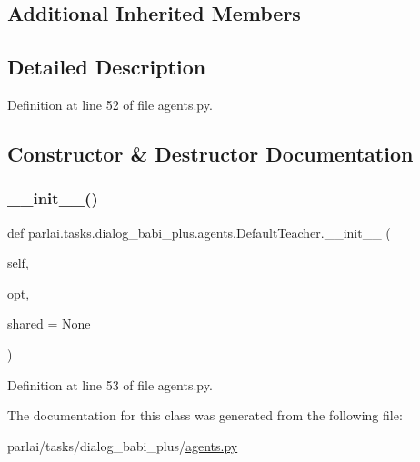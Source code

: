 \subsection*{Additional Inherited Members}


\subsection{Detailed Description}


Definition at line 52 of file agents.\+py.



\subsection{Constructor \& Destructor Documentation}
\mbox{\label{classparlai_1_1tasks_1_1dialog__babi__plus_1_1agents_1_1DefaultTeacher_a672986e909678e098b1315a614611c32}} 
\subsubsection{\texorpdfstring{\+\_\+\+\_\+init\+\_\+\+\_\+()}{\_\_init\_\_()}}
{\footnotesize\ttfamily def parlai.\+tasks.\+dialog\+\_\+babi\+\_\+plus.\+agents.\+Default\+Teacher.\+\_\+\+\_\+init\+\_\+\+\_\+ (\begin{DoxyParamCaption}\item[{}]{self,  }\item[{}]{opt,  }\item[{}]{shared = {\ttfamily None} }\end{DoxyParamCaption})}



Definition at line 53 of file agents.\+py.



The documentation for this class was generated from the following file\+:\begin{DoxyCompactItemize}
\item 
parlai/tasks/dialog\+\_\+babi\+\_\+plus/\hyperlink{parlai_2tasks_2dialog__babi__plus_2agents_8py}{agents.\+py}\end{DoxyCompactItemize}
